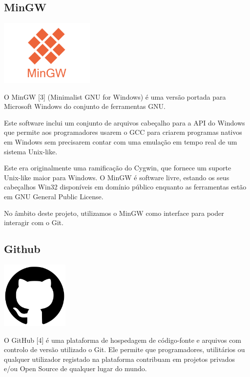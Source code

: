 \documentclass[a4paper,12pt]{article}
\begin{document}
\subsection{MinGW}
    \includegraphics[width=0.35\textwidth]{mingw.png} %
    \vspace{0.5cm}

O MinGW [3] (Minimalist GNU for Windows) é uma versão portada para Microsoft Windows do conjunto de ferramentas GNU. 

Este software inclui um conjunto de arquivos cabeçalho para a API do Windows que permite aos programadores usarem o GCC para criarem programas nativos em Windows sem precisarem contar com uma emulação em tempo real de um sistema Unix-like.

Este era originalmente uma ramificação do Cygwin, que fornece um suporte Unix-like maior para Windows. O MinGW é software livre, estando os seus cabeçalhos Win32 disponíveis em domínio público enquanto as ferramentas estão em GNU General Public License.

No âmbito deste projeto, utilizamos o MinGW como interface para poder interagir com o Git.

\subsection{Github}
    \includegraphics[width=0.25\textwidth]{github.png} %
    \vspace{0.5cm}

O GitHub [4] é uma plataforma de hospedagem de código-fonte e arquivos com controlo de versão utilizado o Git. Ele permite que programadores, utilitários ou qualquer utilizador registado na plataforma contribuam em projetos privados e/ou Open Source de qualquer lugar do mundo. 
\end{document}
